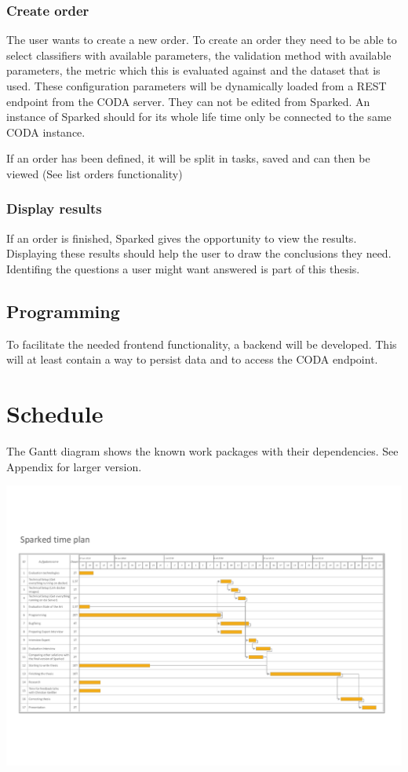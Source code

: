 \documentclass[12pt,a4paper,titlepage,oneside,BCOR1cm]{scrreprt}
\begin{document}
\subsection{Create order}
The user wants to create a new order. 
To create an order they need to be able to select classifiers with available parameters, the validation method with available parameters, the metric which this is evaluated against and the dataset that is used.
These configuration parameters will be dynamically loaded from a REST endpoint from the CODA server. 
They can not be edited from Sparked.
An instance of Sparked should for its whole life time only be connected to the same CODA instance. 

If an order has been defined, it will be split in tasks, saved and can then be viewed (See list orders functionality)

\subsection{Display results}
If an order is finished, Sparked gives the opportunity to view the results. 
Displaying these results should help the user to draw the conclusions they need. 
Identifing the questions a user might want answered is part of this thesis.

\section{Programming}
To facilitate the needed frontend functionality, a backend will be developed. 
This will at least contain a way to persist data and to access the CODA endpoint.

\chapter{Schedule}
The Gantt diagram shows the known work packages with their dependencies. See Appendix for larger version.

\hspace*{-1.5in}
\includegraphics[width=\paperwidth]{gantt-proposal.pdf}
\end{document}
